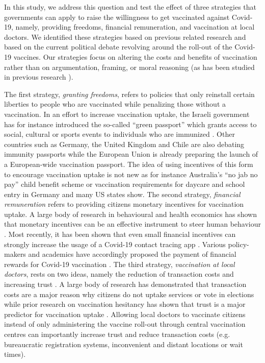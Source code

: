 \documentclass[12pt]{article}
\begin{document}
In this study, we address this question and test the effect of three strategies that governments can apply to raise the willingness to get vaccinated against Covid-19, namely, providing freedoms, financial remuneration, and vaccination at local doctors. We identified these strategies based on previous related research and based on the current political debate revolving around the roll-out of the Covid-19 vaccines. Our strategies focus on altering the costs and benefits of vaccination rather than on argumentation, framing, or moral reasoning (as has been studied in previous research \cite{Duquette2020,Rieger2020,Argote2021a,Argote2021b}). 


The first strategy, \emph{granting freedoms}, refers to policies that only reinstall certain liberties to people who are vaccinated while penalizing those without a vaccination. In an effort to increase vaccination uptake, the Israeli government has for instance introduced the so-called ``green passport'' which grants access to social, cultural or sports events to individuals who are immunized \cite{Wilf-Miron2021}. Other countries such as Germany, the United Kingdom and Chile are also debating immunity passports while the European Union is already preparing the launch of a European-wide vaccination passport. The idea of using incentives of this form to encourage vaccination uptake is not new as for instance Australia's ``no jab no pay'' child benefit scheme or vaccination requirements for daycare and school entry in Germany and many US states show. The second strategy, \emph{financial remuneration} refers to providing citizens monetary incentives for vaccination uptake. A large body of research in behavioural and health economics has shown that monetary incentives can be an effective instrument to steer human behaviour \cite{Kamenica2012,Giles2014}. Most recently, it has been shown that even small financial incentives can strongly increase the usage of a Covid-19 contact tracing app \cite{Munzert2021}. Various policy-makers and academics have accordingly proposed the payment of financial rewards for Covid-19 vaccination \cite{Largent2021,Savulescu2021}. The third strategy, \emph{vaccination at local doctors}, rests on two ideas, namely the reduction of transaction costs and increasing trust  \cite{Volpp2021}. A large body of research has demonstrated that transaction costs are a major reason why citizens do not uptake services or vote in elections \cite{Currie2006,Rosenstone1978} while prior research on vaccination hesitancy has shown that trust is a major predictor for vaccination uptake \cite{Yaqub2014}. Allowing local doctors to vaccinate citizens instead of only administering the vaccine roll-out through central vaccination centres can importantly increase trust and reduce transaction costs (e.g. bureaucratic registration systems, inconvenient and distant locations or wait times).
\end{document}
